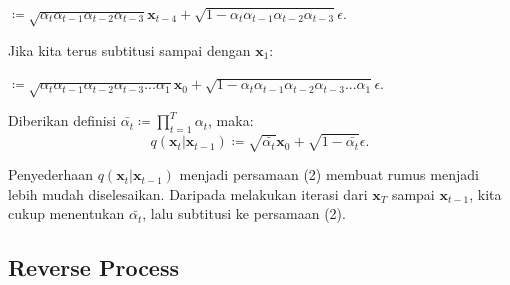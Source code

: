 \documentclass{article}
\begin{document}
\begin{tabbing} 
\hspace{4.75em} $ \coloneq \sqrt{\alpha_t \alpha_{t-1} \alpha_{t-2} \alpha_{t-3}} \textbf{x}_{t-4} + \sqrt{1-\alpha_t\alpha_{t-1}\alpha_{t-2}\alpha_{t-3}} \epsilon $.
\end{tabbing}
Jika kita terus subtitusi  sampai dengan $ \textbf{x}_{1} $:
\begin{tabbing} 
\hspace{4.75em} $ \coloneq \sqrt{\alpha_t \alpha_{t-1} \alpha_{t-2} \alpha_{t-3} ... \alpha_{1}} \textbf{x}_{0} + \sqrt{1-\alpha_t\alpha_{t-1}\alpha_{t-2}\alpha_{t-3}...\alpha_{1}} \epsilon $.
\end{tabbing}
Diberikan definisi $ \bar{\alpha_t} \coloneq \displaystyle \prod_{t=1}^{T} \alpha_t $, maka:
\begin{equation}
q(\textbf{x}_{t}|\textbf{x}_{t-1}) \coloneq \sqrt{\bar{\alpha_t}} \textbf{x}_{0} + \sqrt{1-\bar{\alpha_t}} \epsilon.
\end{equation}

Penyederhaan $ q(\textbf{x}_{t}|\textbf{x}_{t-1}) $ menjadi persamaan (2) membuat rumus menjadi lebih mudah diselesaikan. Daripada melakukan iterasi dari $ \textbf{x}_{T} $ sampai $ \textbf{x}_{t-1} $, kita cukup menentukan $ \bar{\alpha_t} $, lalu subtitusi ke persamaan (2).


\subsection{Reverse Process}
\end{document}
